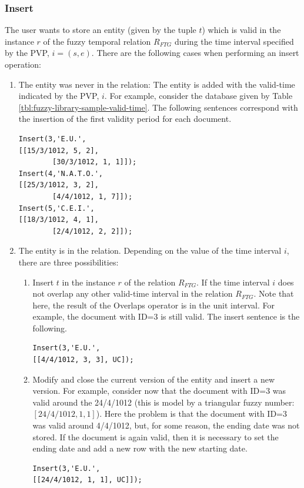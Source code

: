 \subsubsection{\label{subsubsec:insert-fuzzy-temporal}Insert}
The user wants to store an entity (given by the tuple $t$) which is valid in the instance $r$ of the fuzzy temporal relation $R_{FTG}$ during the time interval specified by the PVP, $i = \left(s, e \right)$.
%
%
There are the following cases when performing an insert operation:
\begin{enumerate}
\item The entity was never in the relation: The entity is added with the valid-time indicated by the PVP, $i$.
For example, consider the database given by Table \ref{tbl:fuzzy-library-sample-valid-time}. The following sentences correspond with the insertion of the first validity period for each document.

\begin{verbatim}
Insert(3,'E.U.',
[[15/3/1012, 5, 2],
        [30/3/1012, 1, 1]]);
Insert(4,'N.A.T.O.',
[[25/3/1012, 3, 2], 
        [4/4/1012, 1, 7]]);
Insert(5,'C.E.I.',
[[18/3/1012, 4, 1], 
        [2/4/1012, 2, 2]]);
\end{verbatim}





\item The entity is in the relation. Depending on the value of the time interval $i$, there are three possibilities:
	\begin{enumerate}
	\item Insert $t$ in the instance $r$ of the relation $R_{FTG}$. If the time interval $i$ does not overlap any other valid-time interval in the relation $R_{FTG}$. Note that here, the result of the Overlaps operator is in the unit interval.
For example, the document with ID=3 is still valid. The insert sentence is the following.

 \begin{verbatim}
Insert(3,'E.U.',
[[4/4/1012, 3, 3], UC]);
	      \end{verbatim}

	\item Modify and close the current version of the entity and insert a new version. For example, consider now that the document with ID=3 was valid  around the 24/4/1012 (this is model by a triangular fuzzy number: $\left[24/4/1012, 1, 1 \right]$). Here the problem is that the document with ID=3 was valid around 4/4/1012, but, for some reason, the ending date was not stored. If the document is again valid, then it is necessary to set the ending date and add a new row with the new starting date. %
	    \begin{verbatim}
Insert(3,'E.U.',
[[24/4/1012, 1, 1], UC]]);
	      \end{verbatim}


\end{enumerate}
\end{enumerate}
